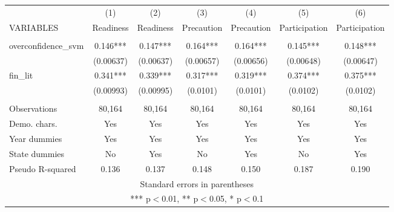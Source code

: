 \documentclass[]{article}
\begin{document}
\begin{tabular}{lcccccc} \hline
 & (1) & (2) & (3) & (4) & (5) & (6) \\
VARIABLES & Readiness & Readiness & Precaution & Precaution & Participation & Participation \\ \hline
 &  &  &  &  &  &  \\
overconfidence\_svm & 0.146*** & 0.147*** & 0.164*** & 0.164*** & 0.145*** & 0.148*** \\
 & (0.00637) & (0.00637) & (0.00657) & (0.00656) & (0.00648) & (0.00647) \\
fin\_lit & 0.341*** & 0.339*** & 0.317*** & 0.319*** & 0.374*** & 0.375*** \\
 & (0.00993) & (0.00995) & (0.0101) & (0.0101) & (0.0102) & (0.0102) \\
 &  &  &  &  &  &  \\
Observations & 80,164 & 80,164 & 80,164 & 80,164 & 80,164 & 80,164 \\
Demo. chars. & Yes & Yes & Yes & Yes & Yes & Yes \\
Year dummies & Yes & Yes & Yes & Yes & Yes & Yes \\
State dummies & No & Yes & No & Yes & No & Yes \\
 Pseudo R-squared & 0.136 & 0.137 & 0.148 & 0.150 & 0.187 & 0.190 \\ \hline
\multicolumn{7}{c}{ Standard errors in parentheses} \\
\multicolumn{7}{c}{ *** p$<$0.01, ** p$<$0.05, * p$<$0.1} \\
\end{tabular}
\end{document}
